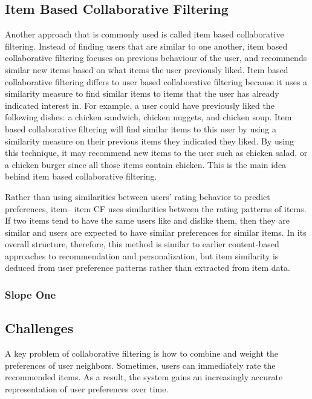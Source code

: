 \subsection{Item Based Collaborative Filtering}

Another approach that is commonly used is called item based collaborative filtering. Instead of finding users that are similar to one another, item based collaborative filtering focuses on previous behaviour of the user, and recommends similar new items based on what items the user previously liked. Item based collaborative filtering differs to user based collaborative filtering because it uses a similarity measure to find similar items to items that the user has already indicated interest in. For example, a user could have previously liked the following dishes: a chicken sandwich, chicken nuggets, and chicken soup. Item based collaborative filtering will find similar items to this user by using a similarity measure on their previous items they indicated they liked. By using this technique, it may recommend new items to the user such as chicken salad, or a chicken burger since all those items contain chicken. This is the main idea behind item based collaborative filtering. 

\cite{schafer2007collaborative}

 Rather than using
similarities between users’ rating behavior to predict preferences, item–
item CF uses similarities between the rating patterns of items. If two
items tend to have the same users like and dislike them, then they are
similar and users are expected to have similar preferences for similar
items. In its overall structure, therefore, this method is similar to earlier
content-based approaches to recommendation and personalization, but
item similarity is deduced from user preference patterns rather than
extracted from item data.


\subsubsection{Slope One}

\subsection{Challenges}
A key problem of collaborative filtering is how to combine and weight the preferences of user neighbors. Sometimes, users can immediately rate the recommended items. As a result, the system gains an increasingly accurate representation of user preferences over time.

